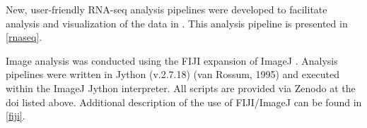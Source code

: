 New, user-friendly RNA-seq analysis pipelines were developed to facilitate analysis and visualization of the data in \citet{Saelens2022}. This analysis pipeline is presented in \autoref{rnaseq}.

Image analysis was conducted using the FIJI \citep{Schindelin2012, Rueden2017} expansion of ImageJ \citep{Schneider2012}. Analysis pipelines were written in Jython (v.2.7.18) (van Rossum, 1995) and executed within the ImageJ Jython interpreter. All scripts are provided via Zenodo at the doi listed above. Additional description of the use of FIJI/ImageJ can be found in \autoref{fiji}.

